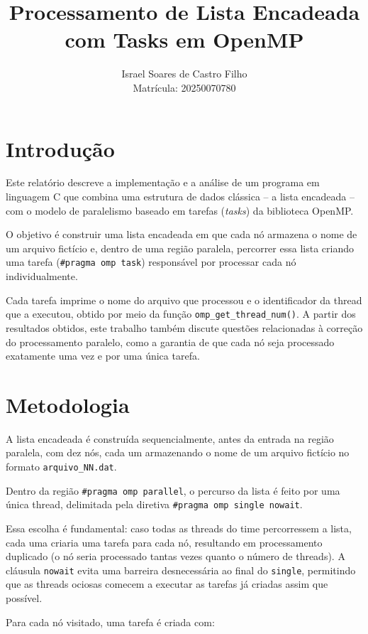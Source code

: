 \documentclass[a4paper,12pt]{article}
\title{Processamento de Lista Encadeada com Tasks em OpenMP}
\author{Israel Soares de Castro Filho \\ Matrícula: 20250070780}
\date{}
\begin{document}
\maketitle

\section{Introdução}

Este relatório descreve a implementação e a análise de um programa em linguagem C que combina uma estrutura de dados clássica -- a lista encadeada -- 
com o modelo de paralelismo baseado em tarefas (\textit{tasks}) da biblioteca OpenMP. 

O objetivo é construir uma lista encadeada em que cada nó armazena o nome de um arquivo fictício e, 
dentro de uma região paralela, percorrer essa lista criando uma tarefa (\texttt{\#pragma omp task}) responsável por processar cada nó individualmente. 

Cada tarefa imprime o nome do arquivo que processou e o identificador da thread que a executou, 
obtido por meio da função \texttt{omp\_get\_thread\_num()}. A partir dos resultados obtidos, 
este trabalho também discute questões relacionadas à correção do processamento paralelo, como a garantia de que cada nó seja processado exatamente uma vez e por uma única tarefa.

\section{Metodologia}

A lista encadeada é construída sequencialmente, antes da entrada na região paralela, 
com dez nós, cada um armazenando o nome de um arquivo fictício no formato \texttt{arquivo\_NN.dat}.

Dentro da região \texttt{\#pragma omp parallel}, o percurso da lista é feito por uma única thread, 
delimitada pela diretiva \texttt{\#pragma omp single nowait}. 

Essa escolha é fundamental: caso todas as threads do time percorressem a lista, cada uma criaria uma tarefa para cada nó, 
resultando em processamento duplicado (o nó seria processado tantas vezes quanto o número de threads). A cláusula \texttt{nowait} evita uma barreira desnecessária 
ao final do \texttt{single}, permitindo que as threads ociosas comecem a executar as tarefas já criadas assim que possível.

Para cada nó visitado, uma tarefa é criada com:
\end{document}
